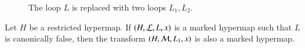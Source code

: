 \begin{figure}[htb]
\centering
{}
\caption{The loop $L$ is replaced with two loops $L_1, L_2$.}
\label{fig:L1L2}
\end{figure}





\begin{lemma}\label{lemma:flag} 
Let $H$ be a restricted hypermap.
If $(H,{\cal L},L,x)$ is a marked hypermap such that $L$
is canonically false,  then the transform
$(H,{\cal M},L_1,x)$ 
is also a marked hypermap.
\end{lemma}

